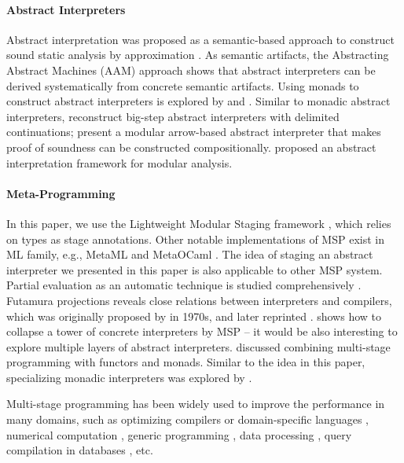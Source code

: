 \paragraph{Abstract Interpreters} Abstract interpretation was proposed as a
semantic-based approach to construct sound static analysis by approximation
\cite{DBLP:conf/popl/CousotC77}. As semantic artifacts, the Abstracting Abstract
Machines (AAM) \cite{DBLP:journals/jfp/HornM12, DBLP:conf/icfp/HornM10} approach
shows that abstract interpreters can be derived systematically from concrete
semantic artifacts.
Using monads to construct abstract interpreters is explored by
\citet{Sergey:2013:MAI:2491956.2491979} and
\citet{DBLP:journals/pacmpl/DaraisLNH17, Darais:2015:GTM:2814270.2814308}.
Similar to monadic abstract interpreters, \citet{Wei:2018:RAA:3243631.3236800}
reconstruct big-step abstract interpreters with delimited continuations;
\citet{Keidel:2018:CSP:3243631.3236767} present a modular arrow-based abstract
interpreter that makes proof of soundness can be constructed compositionally.
\citet{DBLP:conf/cc/CousotC02} proposed an abstract interpretation framework for
modular analysis.

\paragraph{Meta-Programming} In this paper, we use the Lightweight Modular
Staging framework \cite{DBLP:conf/gpce/RompfO10}, which relies on types as stage
annotations. Other notable implementations of MSP exist in ML family, e.g.,
MetaML \cite{DBLP:conf/pepm/TahaS97} and MetaOCaml
\cite{DBLP:conf/gpce/CalcagnoTHL03, DBLP:conf/flops/Kiselyov14}.
The idea of staging an abstract interpreter we presented in this paper is also
applicable to other MSP system. Partial evaluation as an automatic technique is
studied comprehensively \cite{10.1007/3-540-61580-6_11,
DBLP:books/daglib/0072559}. Futamura projections reveals close relations between
interpreters and compilers, which was originally proposed by
\citeauthor{futamura1971partial} in 1970s\cite{futamura1971partial}, and later
reprinted \cite{Futamura1999}.
\citeauthor{Amin:2017:CTI:3177123.3158140} shows how to collapse a tower of
concrete interpreters by MSP -- it would be also interesting to explore multiple
layers of abstract interpreters.
\citet{10.1007/11561347_18} discussed combining
multi-stage programming with functors and monads.
Similar to the idea in this paper, specializing monadic interpreters was
explored by \citet{DBLP:conf/dsl/SheardBP99, danvy1991compiling}.

Multi-stage programming has been widely used to improve the performance in many
domains, such as optimizing compilers or domain-specific languages
\cite{DBLP:conf/pldi/RompfSBLCO14, DBLP:conf/snapl/RompfBLSJAOSKDK15,
DBLP:journals/tecs/SujeethBLRCOO14, DBLP:conf/gpce/SujeethGBLROO13,
DBLP:journals/jfp/CaretteKS09}, numerical computation \cite{PGL-038,
DBLP:conf/pepm/AktemurKKS13}, generic programming
\cite{DBLP:journals/pacmpl/Yallop17, Ofenbeck:2017:SGP:3136040.3136060}, data
processing \cite{DBLP:conf/oopsla/JonnalageddaCSRO14,
DBLP:conf/popl/KiselyovBPS17}, query compilation in databases
\cite{DBLP:conf/osdi/EssertelTDBOR18, DBLP:conf/sigmod/TahboubER18}, etc.
